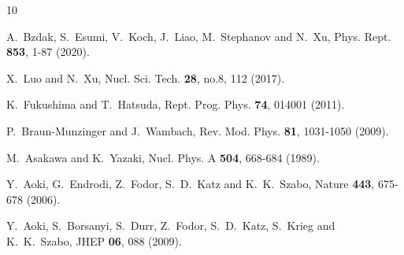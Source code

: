 \documentclass[10pt,aps,prc,twocolumn,floatfix]{revtex4-1}
\begin{document}
\begin{thebibliography}{10}

A.~Bzdak, S.~Esumi, V.~Koch, J.~Liao, M.~Stephanov and N.~Xu,
Phys. Rept. \textbf{853}, 1-87 (2020).

X.~Luo and N.~Xu,
Nucl. Sci. Tech. \textbf{28}, no.8, 112 (2017).


K.~Fukushima and T.~Hatsuda,
Rept. Prog. Phys. \textbf{74}, 014001 (2011).

P.~Braun-Munzinger and J.~Wambach,
Rev. Mod. Phys. \textbf{81}, 1031-1050 (2009).

M.~Asakawa and K.~Yazaki, 
Nucl. Phys. A \textbf{504}, 668-684 (1989).


Y.~Aoki, G.~Endrodi, Z.~Fodor, S.~D.~Katz and K.~K.~Szabo,
Nature \textbf{443}, 675-678 (2006).

Y.~Aoki, S.~Borsanyi, S.~Durr, Z.~Fodor, S.~D.~Katz, S.~Krieg and K.~K.~Szabo,
JHEP \textbf{06}, 088 (2009).


\end{thebibliography}
\end{document}
